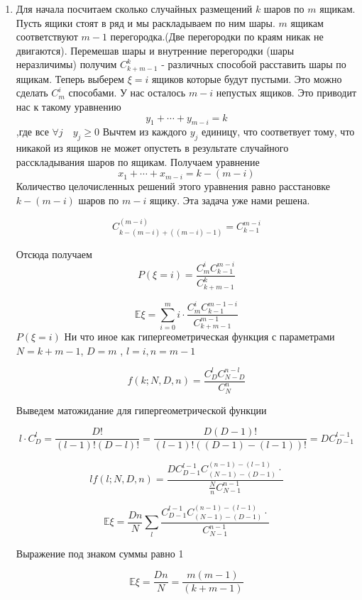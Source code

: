 \begin{solution}
	\begin{enumerate}
		\item 
		Для начала посчитаем сколько случайных размещений $ k $ шаров по $ m $ ящикам.
		Пусть ящики стоят в ряд и мы раскладываем по ним шары. $ m $ ящикам соответствуют $ m-1 $ перегородка.(Две перегородки по краям никак не двигаются). Перемешав шары и внутренние перегородки (шары неразличимы) получим $ \displaystyle 
		C_{k+m-1}^{k}$ - различных способой расставить шары по ящикам.
		 Теперь выберем $ \xi = i $ ящиков которые будут пустыми.
		 Это можно сделать $ \displaystyle C^{i}_{m} $ способами.
		 У нас осталось $ m - i  $ непустых ящиков. Это приводит нас к такому уравнению
		 $$
		 y_{1}+\cdots+y_{m-i}=k
		 $$
		 ,где все $ \forall j \quad y_{j} \ge 0 $
		  Вычтем из каждого $ y_{j} $ единицу, что соответвует тому, что никакой из ящиков не может опустеть в результате случайного расскладывания шаров по ящикам. Получаем уравнение
		  $$ 
		  x_{1}+\cdots+x_{m-i} = k - (m - i)
		  $$
		  Количество целочисленных решений этого уравнения равно расстановке $ k - (m -i) $ шаров по $ m - i $  ящику.
		  Эта задача уже нами решена.
		  
		  $$ C^{(m -i)}_{k - (m -i) + ((m -i)-1) } = C^{m-i}_{k-1}$$
		  
		  Отсюда получаем $$ P(\xi = i) = \frac{C_{m}^{i} C^{m-i}_{k-1}}{C_{k+m-1}^{k}}$$
		  
		  $$
		  \mathbb{E} \xi = \sum_{i=0}^{m} i \cdot \frac{C_{m}^{i} C^{m-1-i}_{k-1}}{C_{k+m-1}^{m-1}} 
		  $$
		  $
		  P(\xi=i)
		  $ Ни что иное как гипергеометрическая функция с параметрами $ N = k + m -1 $, $ D = m $ , $ l = i , n = m -1  $
		  
	$$
	f(k ; N, D, n) = 
	\frac{C_{D}^{l} C_{N-D}^{n-l}}{C_{N}^{n}}
	$$
	
	Выведем матожидание для гипергеометрической функции
	
	$$ 
		l \cdot C^{l}_{D} = \frac{D !}{(l-1) !(D-l) !}=\frac{D(D-1) !}{(l-1) !((D-1)-(l-1)) !} = D C^{l-1}_{D-1}
	$$
	
	$$
		l f(l ; N, D, n) =  \frac{D C^{l-1}_{D-1} C_{(N-1)-(D-1)}^{(n-1)-(l-1)}\cdot}{\frac{N}{n} C^{n-1}_{N-1}}
	$$
	
	$$	 
	\mathbb{E} \xi = \frac{Dn}{N} \sum_{l} 
	\frac{ C^{l-1}_{D-1} C_{(N-1)-(D-1)}^{(n-1)-(l-1)}\cdot}{C^{n-1}_{N-1}}
	$$	
	
	Выражение под знаком суммы  равно 1
	
	$$ \mathbb{E} \xi = \frac{Dn}{N}=\frac{m(m-1)}{(k+m-1)} $$
	 
	\end{enumerate}
\end{solution}	